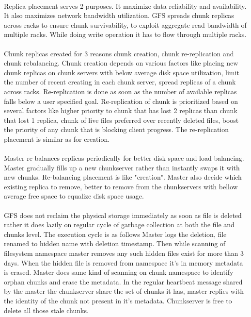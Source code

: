 \documentclass[8pt]{extarticle}
\begin{document}
	\paragraph{}
	Replica placement serves 2 purposes. It maximize data reliability and availability. It also maximizes network bandwidth utilization. GFS spreads chunk replicas  across racks to ensure chunk survivability, to exploit aggregate read bandwidth of multiple racks. While doing write operation it has to flow through multiple racks.
	
	\paragraph{}
	Chunk replicas created for 3 reasons chunk creation, chunk re-replication and chunk rebalancing. Chunk creation depends on various factors like placing new chunk replicas on chunk servers with below average disk space utilization, limit the number of recent creating in each chunk server, spread replicas of a chunk across racks.
	Re-replication is done  as soon as the number of available replicas falls below a user specified goal. Re-replication of chunk is prioritized based on several factors like higher priority to chunk that has lost 2 replicas than chunk that lost 1 replica, chunk of live files preferred over recently deleted files, boost the priority of any chunk that is blocking client progress. The re-replication placement is similar as for creation. 
	
	\paragraph{}
	Master re-balances replicas periodically for better disk space and load balancing. Master gradually fills up a new chunkserver rather than instantly swaps it with new chunks. Re-balancing placement is like "creation". Master also decide  which existing replica to remove, better to remove from the chunkservers with bellow average free space to equalize disk space usage.
	
	\paragraph{}
	GFS does not reclaim the physical storage immediately as soon as file is deleted rather it does lazily on regular cycle of garbage collection at both the file and chunks level. The execution cycle is as follows Master logs the deletion, file renamed to hidden name with deletion timestamp. Then while scanning of filesystem namespace master removes any such hidden files exist for more than 3 days. When the hidden file is removed from namespace it's in memory metadata is erased. Master does same kind of scanning on chunk namespace to identify orphan chunks and erase the metadata. In the regular heartbeat message shared by the master the chunkserver share the set of chunks it has, master replies with the identity of the chunk not present in it's metadata. Chunkserver is free to delete all those stale chunks.
	
\end{document}
